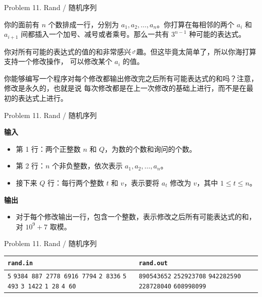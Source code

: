 \documentclass[UTF8]{beamer}
\begin{document}

\begin{frame}{Problem 11. Rand / 随机序列}

你的面前有 $n$ 个数排成一行，分别为 $a_1, a_2, \dots, a_n$。你打算在每相邻的两个
$a_i$ 和 $a_{i+1}$ 间都插入一个加号、减号或者乘号。那么一共有 $3^{n-1}$ 种可能的表达式。

你对所有可能的表达式的值的和非常感兴♂趣。但这毕竟太简单了，所以你海打算支持一个修改操作，
可以修改某个 $a_i$ 的值。

你能够编写一个程序对每个修改都输出修改完之后所有可能表达式的和吗？注意，修改是永久的，也就是说
每次修改都是在上一次修改的基础上进行，而不是在最初的表达式上进行。

\end{frame}

\begin{frame}{Problem 11. Rand / 随机序列}

\textbf{输入}
\begin{itemize}
    \item 第 1 行：两个正整数 $n$ 和 $Q$，为数的个数和询问的个数。
    \item 第 2 行：$n$ 个非负整数，依次表示 $a_1, a_2, \dots, a_n$。
    \item 接下来 $Q$ 行：每行两个整数 $t$ 和 $v$，表示要将 $a_t$ 修改为 $v$，其中 $1 \leq t \leq n$。
\end{itemize}
\textbf{输出}
\begin{itemize}
    \item 对于每个修改输出一行，包含一个整数，表示修改之后所有可能表达式的和，对 $10^9 + 7$ 取模。
\end{itemize}

\end{frame}

\begin{frame}{Problem 11. Rand / 随机序列}

\begin{tabularx}{\textwidth}{|X|X|}
\hline
\texttt{\textbf{rand.in}} & \texttt{\textbf{rand.out}} \\ \hline
\texttt{5}\newline
\texttt{9384 887 2778 6916 7794}\newline
\texttt{2 8336}\newline
\texttt{5 493}\newline
\texttt{3 1422}\newline
\texttt{1 28}\newline
\texttt{4 60}
&
\texttt{890543652}\newline
\texttt{252923708}\newline
\texttt{942282590}\newline
\texttt{228728040}\newline
\texttt{608998099}
\\ \hline
\end{tabularx}
\newline

\end{frame}
\end{document}
